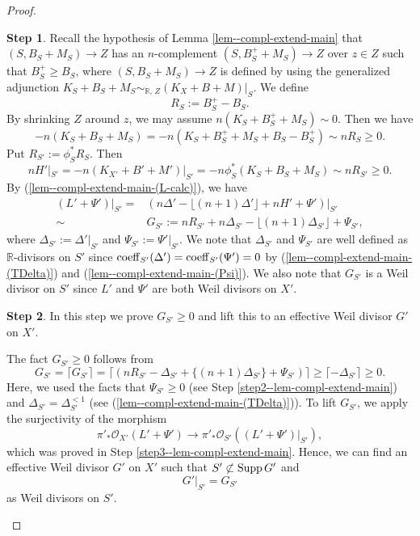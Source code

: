 \documentclass[12pt]{amsart}
\theoremstyle{definition}
\newtheorem{step1}{Step}
\begin{document}
\begin{proof}
\begin{step1}
Recall the hypothesis of Lemma \ref{lem--compl-extend-main} that $(S,B_{S}+M_{S}) \to Z$ has an $n$-complement $(S,B^{+}_{S}+M_{S}) \to Z$ over $z \in Z$ such that $B^{+}_{S} \geq B_{S}$, where $(S,B_{S}+M_{S}) \to Z$ is defined by using the generalized adjunction $K_{S}+B_{S}+M_{S}\sim_{\mathbb{R},\,Z}(K_{X}+B+M)|_{S}$. 
We define 
$$R_{S}:=B^{+}_{S}-B_{S}.$$ 
By shrinking $Z$ around $z$, we may assume $n(K_{S}+B^{+}_{S}+M_{S}) \sim 0$. 
Then we have
$$-n(K_{S}+B_{S}+M_{S})=-n(K_{S}+B^{+}_{S}+M_{S}+B_{S}-B^{+}_{S}) \sim nR_{S} \geq 0.$$
Put $R_{S'}:=\phi^{*}_{S}R_{S}$. 
Then
$$nH'|_{S'}=-n(K_{X'}+B'+M')|_{S'} = -n \phi^{*}_{S}(K_{S}+B_{S}+M_{S}) \sim nR_{S'} \geq 0.$$
By (\ref{lem--compl-extend-main-(L-calc)}), we have
\begin{equation}\label{lem--compl-extend-main-(G)}
\begin{split}
(L'+\Psi')|_{S'}=&(n\Delta' - \lfloor (n+1)\Delta' \rfloor+nH'+\Psi')|_{S'} \\
\sim &G_{S'}:=nR_{S'}+n\Delta_{S'} - \lfloor (n+1)\Delta_{S'} \rfloor+\Psi_{S'},
\end{split}
\end{equation}
where $\Delta_{S'}:=\Delta'|_{S'}$ and $\Psi_{S'}:=\Psi'|_{S'}$. 
We note that $\Delta_{S'}$ and $\Psi_{S'}$ are well defined as $\mathbb{R}$-divisors on $S'$ since ${\rm coeff}_{S'}(\Delta')={\rm coeff}_{S'}(\Psi')=0$ by (\ref{lem--compl-extend-main-(TDelta)}) and (\ref{lem--compl-extend-main-(Psi)}). 
We also note that $G_{S'}$ is a Weil divisor on $S'$ since $L'$ and $\Psi'$ are both Weil divisors on $X'$. 
\end{step1}

\begin{step1}\label{step5--lem-compl-extend-main}
In this step we prove $G_{S'} \geq 0$ and lift this to an effective Weil divisor $G'$ on $X'$. 

The fact $G_{S'} \geq 0$ follows from
$$G_{S'}= \lceil G_{S'}\rceil=\lceil (nR_{S'}-\Delta_{S'} + \{(n+1)\Delta_{S'}\}+\Psi_{S'})\rceil\geq \lceil -\Delta_{S'}\rceil \geq 0.$$
Here, we used the facts that $\Psi_{S'}\geq 0$ (see Step \ref{step2--lem-compl-extend-main}) and $\Delta_{S'}=\Delta^{<1}_{S'}$ (see (\ref{lem--compl-extend-main-(TDelta)})).  
To lift $G_{S'}$, we apply the surjectivity of the morphism
$$\pi'_{*}\mathcal{O}_{X'}(L'+\Psi')\longrightarrow \pi'_{*}\mathcal{O}_{S'}((L'+\Psi')|_{S'}),$$
which was proved in Step \ref{step3--lem-compl-extend-main}. 
Hence, we can find an effective Weil divisor $G'$ on $X'$ such that $S' \not\subset {\rm Supp}\,G'$ and 
$$G'|_{S'}=G_{S'}$$
as Weil divisors on $S'$. 
\end{step1}


\end{proof}
\end{document}
